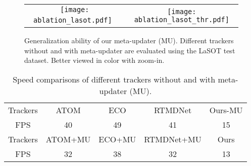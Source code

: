 \documentclass[10pt,twocolumn,letterpaper]{article}
\begin{document}
\begin{figure}[h]
\vspace{-2mm}
\begin{center}
\begin{tabular}{c@{}c}
\texttt{[image: ablation\_lasot.pdf]}\ &
\texttt{[image: ablation\_lasot\_thr.pdf]}\\
\end{tabular}
\end{center}
\vspace{-5mm}
\caption{Generalization ability of our meta-updater (MU). Different trackers without
and with meta-updater are evaluated using the LaSOT test dataset. Better viewed
in color with zoom-in.}
\label{fig:ablation_lasot}
\vspace{-2mm}
\end{figure}
\begin{table}[h]
\caption{Speed comparisons of different trackers without and with meta-updater (MU).}
\label{tab:updater_fps}
\footnotesize
\begin{tabular}{ccccc}
\hline
Trackers & ATOM &ECO &RTMDNet  &Ours-MU \\
FPS       & 40   &49  &41 &15 \\
\hline
Trackers &ATOM+MU &ECO+MU  &RTMDNet+MU & Ours\\
FPS      &32 &38 &32 &13\\
\hline
\end{tabular}
\vspace{-1mm}
\end{table}
\end{document}
